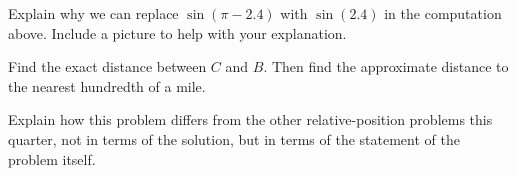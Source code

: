 \documentclass{ximera}
\begin{document}
\begin{example}
\begin{explanation}
\begin{question}  \label{Q34rg4t5rt}
Explain why we can replace $\sin (\pi -  2.4)$ with $\sin (2.4)$ in the computation above. Include a picture to help with your explanation.
\end{question}

\begin{question}   \label{Qd45r5643rs}
Find the exact distance between $C$ and $B$. Then find the approximate distance to the nearest hundredth of a mile.
\end{question}


\begin{question}  \label{Qerdef6645yu}
Explain how this problem differs from the other relative-position problems this quarter, not in terms of the solution, but in terms of the statement of the problem itself.
\end{question}




\end{explanation}


\end{example}
\end{document}
